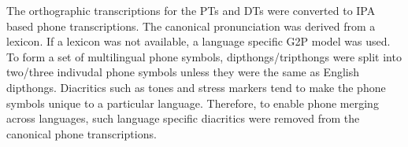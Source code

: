 \documentclass[a4paper]{article}
\begin{document}
The orthographic transcriptions for the PTs and DTs were converted to IPA based phone transcriptions. The canonical pronunciation was derived from a lexicon. If a lexicon was not available, a language specific G2P model was used. To form a set of multilingual phone symbols, dipthongs/tripthongs were split into two/three indivudal phone symbols unless they were the same as English dipthongs. Diacritics such as tones and stress markers tend to make the phone symbols unique to a particular language.  Therefore, to enable phone merging across languages, such language specific diacritics were removed from the canonical phone transcriptions.

\end{document}
